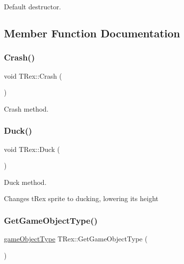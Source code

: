 Default destructor. 



\subsection{Member Function Documentation}
\mbox{\label{class_t_rex_a8881cde6c1a996532fa34cdb413ac441}} 
\subsubsection{\texorpdfstring{Crash()}{Crash()}}
{\footnotesize\ttfamily void T\+Rex\+::\+Crash (\begin{DoxyParamCaption}{ }\end{DoxyParamCaption})}



Crash method. 

\mbox{\label{class_t_rex_a1e672bcdbbeab5bc66c1812e3be30fd3}} 
\subsubsection{\texorpdfstring{Duck()}{Duck()}}
{\footnotesize\ttfamily void T\+Rex\+::\+Duck (\begin{DoxyParamCaption}{ }\end{DoxyParamCaption})}



Duck method. 

Changes t\+Rex sprite to ducking, lowering its height \mbox{\label{class_t_rex_ae376c4623c619940213ea75f57d721d5}} 
\subsubsection{\texorpdfstring{Get\+Game\+Object\+Type()}{GetGameObjectType()}}
{\footnotesize\ttfamily \mbox{\hyperlink{class_game_object_ad5092169e581fb0772e01026882ea0c8}{game\+Object\+Type}} T\+Rex\+::\+Get\+Game\+Object\+Type (\begin{DoxyParamCaption}{ }\end{DoxyParamCaption})\hspace{0.3cm}{\ttfamily [inline]}}

